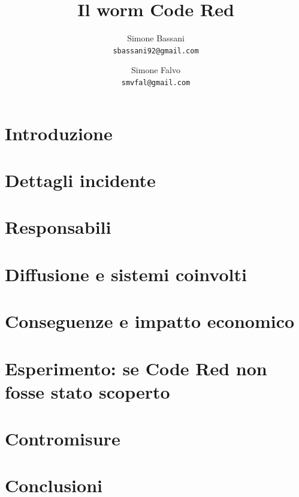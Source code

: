 \documentclass[a4paper,titlepage]{article}
\begin{document}

\title{
  Il worm Code Red
}
\author{
  Simone Bassani\\
  \texttt{sbassani92@gmail.com}
  \and
  Simone Falvo\\
  \texttt{smvfal@gmail.com}
}

\date{}


\maketitle

%

\tableofcontents
\newpage

\section{Introduzione}


\section{Dettagli incidente}


\section{Responsabili}


\section{Diffusione e sistemi coinvolti}


\section{Conseguenze e impatto economico}


\section{Esperimento: se Code Red non fosse stato scoperto}


\section{Contromisure}


\section{Conclusioni}



\end{document}
